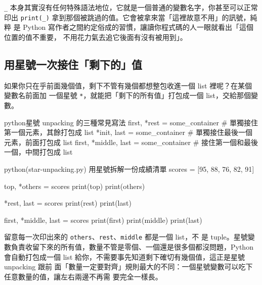 
\texttt{\_} 本身其實沒有任何特殊語法地位，它就是一個普通的變數名字，你甚至可以正常
印出 \texttt{print(\_)} 拿到那個被跳過的值。它會被拿來當「這裡故意不用」的訊號，純粹
是 Python 寫作者之間約定俗成的習慣，讓讀你程式碼的人一眼就看出「這個位置的值不重要，
不用花力氣去追它後面有沒有被用到」。

\subsection*{用星號一次接住「剩下的」值}

如果你只在乎前面幾個值，剩下不管有幾個都想整包收進一個 list 裡呢？在某個變數名前面加
一個星號 \texttt{*}，就能把「剩下的所有值」打包成一個 list，交給那個變數。

\begin{code}{python}{星號 unpacking 的三種常見寫法}
first, *rest = some_container      # 單獨接住第一個元素，其餘打包成 list
*init, last = some_container       # 單獨接住最後一個元素，前面打包成 list
first, *middle, last = some_container  # 接住第一個和最後一個，中間打包成 list
\end{code}

\begin{example}{python}{(star-unpacking.py) 用星號拆解一份成績清單}
scores = [95, 88, 76, 82, 91]

top, *others = scores
print(top)
print(others)

*rest, last = scores
print(rest)
print(last)

first, *middle, last = scores
print(first)
print(middle)
print(last)
\end{example}


留意每一次印出來的 \texttt{others}、\texttt{rest}、\texttt{middle} 都是一個 list，不
是 tuple。星號變數負責收留下來的所有值，數量不管是零個、一個還是很多個都沒問題，Python
會自動打包成一個 list 給你，不需要事先知道剩下確切有幾個值，這正是星號 unpacking 跟前
面「數量一定要對齊」規則最大的不同：一個星號變數可以吃下任意數量的值，讓左右兩邊不再需
要完全一樣長。

